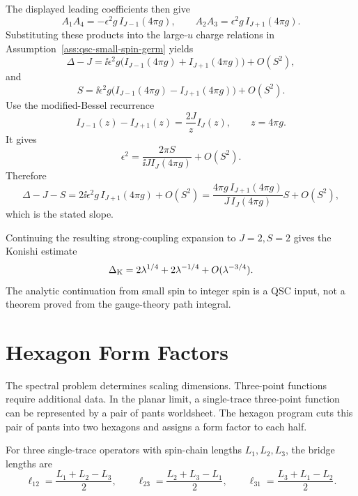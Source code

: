 The displayed leading coefficients then give
\[
  A_1A_4=-\epsilon^2 g\,I_{J-1}(4\pi g),
  \qquad
  A_2A_3=\epsilon^2 g\,I_{J+1}(4\pi g).
\]
Substituting these products into the large-\(u\) charge relations in
Assumption~\ref{ass:qsc-small-spin-germ} yields
\[
  \Delta-J
  =
  \ii\epsilon^2g\bigl(I_{J-1}(4\pi g)+I_{J+1}(4\pi g)\bigr)+O(S^2),
\]
and
\[
  S
  =
  \ii\epsilon^2g\bigl(I_{J-1}(4\pi g)-I_{J+1}(4\pi g)\bigr)+O(S^2).
\]
Use the modified-Bessel recurrence
\[
  I_{J-1}(z)-I_{J+1}(z)=\frac{2J}{z}I_J(z),
  \qquad z=4\pi g.
\]
It gives
\[
  \epsilon^2
  =
  \frac{2\pi S}{\ii J I_J(4\pi g)}+O(S^2).
\]
Therefore
\[
  \Delta-J-S
  =
  2\ii\epsilon^2g\,I_{J+1}(4\pi g)+O(S^2)
  =
  \frac{4\pi g\,I_{J+1}(4\pi g)}{J\,I_J(4\pi g)}S+O(S^2),
\]
which is the stated slope.

Continuing the resulting strong-coupling expansion to \(J=2,S=2\) gives the
Konishi estimate
\[
  \Delta_{\rm K}
  =
  2\lambda^{1/4}+2\lambda^{-1/4}+O(\lambda^{-3/4}).
\]
The analytic continuation from small spin to integer spin is a QSC input, not
a theorem proved from the gauge-theory path integral.

\section{Hexagon Form Factors}

The spectral problem determines scaling dimensions.  Three-point functions
require additional data.  In the planar limit, a single-trace three-point
function can be represented by a pair of pants worldsheet.  The hexagon
program cuts this pair of pants into two hexagons and assigns a form factor to
each half.

For three single-trace operators with spin-chain lengths \(L_1,L_2,L_3\), the
bridge lengths are
\[
  \ell_{12}=\frac{L_1+L_2-L_3}{2},\qquad
  \ell_{23}=\frac{L_2+L_3-L_1}{2},\qquad
  \ell_{31}=\frac{L_3+L_1-L_2}{2}.
\]

